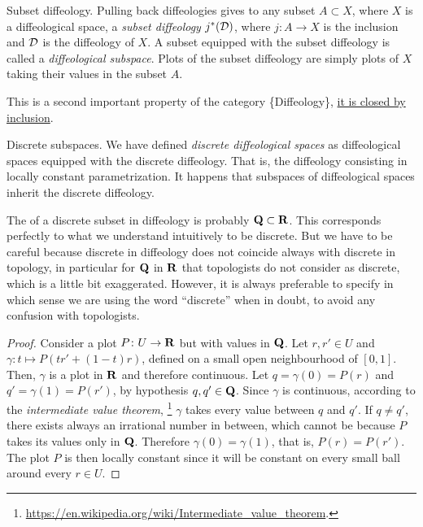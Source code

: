 \begin{Article}{Subset diffeology.}
  Pulling back diffeologies gives to any subset $A \subset X$,
  where $X$ is a diffeological space,
  a \emph{subset diffeology} $j^*(\mathcal{D})$,
  where $j \colon A \to X$ is the inclusion and $\mathcal{D}$ is the diffeology of $X$.
  A subset equipped with the subset diffeology is called a \emph{diffeological subspace}.
  Plots of the subset diffeology are simply plots of $X$ taking their values in the subset $A$.
  
  This is a second important property of the category \{Diffeology\},
  \uline{it is closed by inclusion}.
\end{Article}

\begin{Article}{Discrete subspaces.}
  We have defined \emph{discrete diffeological spaces} as diffeological spaces equipped with the discrete diffeology.
  That is,
  the diffeology consisting in locally constant parametrization.
  It happens that subspaces of diffeological spaces inherit the discrete diffeology.
  
  The  of a discrete subset in diffeology is probably $\mathbf{Q} \subset \mathbf{R}$.
  This corresponds perfectly to what we understand intuitively to be discrete.
  But we have to be careful because discrete in diffeology does not coincide always with discrete in topology,
  in particular for $\mathbf{Q}$ in $\mathbf{R}$ that topologists do not consider as discrete,
  which is a little bit exaggerated.
  However,
  it is always preferable to specify in which sense we are using the word ``discrete'' when in doubt,
  to avoid any confusion with topologists.
\end{Article}

\begin{proof}
  Consider a plot $P \colon U \to \mathbf{R}$ but with values in $\mathbf{Q}$.
  Let $r, r' \in U$ and $\gamma \colon t \mapsto P(tr' +(1-t)r )$,
  defined on a small open neighbourhood of $[0,1]$.
  Then,
  $\gamma$ is a plot in $\mathbf{R}$ and therefore continuous.
  Let $q = \gamma(0) = P(r)$ and $q' = \gamma(1) = P(r')$,
  by hypothesis $q,q' \in \mathbf{Q}$.
  Since $\gamma$ is continuous,
  according to the \emph{intermediate value theorem},%
  \footnote{\url{https://en.wikipedia.org/wiki/Intermediate_value_theorem}.}
  $\gamma$ takes every value between $q$ and $q'$.
  If $q \neq q'$, there exists always an irrational number in between,
  which cannot be because $P$ takes its values only in $\mathbf{Q}$.
  Therefore $\gamma(0) = \gamma(1)$,
  that is,
  $P(r) = P(r')$.
  The plot $P$ is then locally constant since it will be constant on every small ball around every $r \in U$.
\end{proof}

